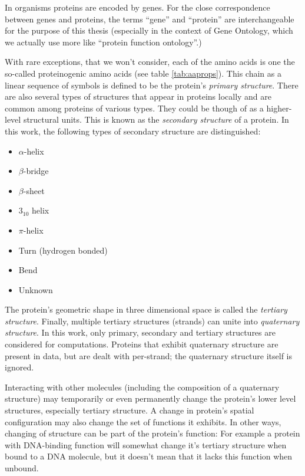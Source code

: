 \documentclass[11pt,twoside,a4paper]{book}
\begin{document}
In organisms proteins are encoded by genes. 
For the close correspondence between genes and proteins,
the terms ``gene'' and ``protein'' are interchangeable for the purpose of this thesis
(especially in the context of Gene Ontology, which we actually use more like ``protein function ontology''.)

With rare exceptions, that we won't consider, each of the amino acids is one the
so-called proteinogenic amino acids (see table \ref{tab:aaprops}). 
This chain as a linear sequence of symbols is defined to be the protein's \emph{primary structure}.
There are also several types of structures that appear in proteins locally and are common among
proteins of various types.
They could be though of as a higher-level structural units. This is known as the \emph{secondary structure}
of a protein. In this work, the following types of secondary structure are distinguished:
\begin{itemize}
 \item $\alpha$-helix
 \item $\beta$-bridge
 \item $\beta$-sheet
 \item $3_{10}$ helix
 \item $\pi$-helix
 \item Turn (hydrogen bonded)
 \item Bend
 \item Unknown
\end{itemize}
The protein's geometric shape in three dimensional space is called the \emph{tertiary structure}. 
Finally, multiple tertiary structures (strands) can unite into \emph{quaternary structure}.
In this work, only primary, secondary and tertiary structures are considered for computations.
Proteins that exhibit quaternary structure are present in data, but are dealt with per-strand; 
the quaternary structure itself is ignored.

Interacting with other molecules (including the composition of a quaternary structure)
may temporarily or even permanently change the protein's lower level structures,
especially tertiary structure.
A change in protein's spatial configuration may also change the set of functions
it exhibits. 
In other ways, changing of structure can be part of the protein's function:
For example a protein with DNA-binding function will somewhat change it's tertiary
structure when bound to a DNA molecule, but it doesn't mean that it lacks this
function when unbound.
\end{document}
